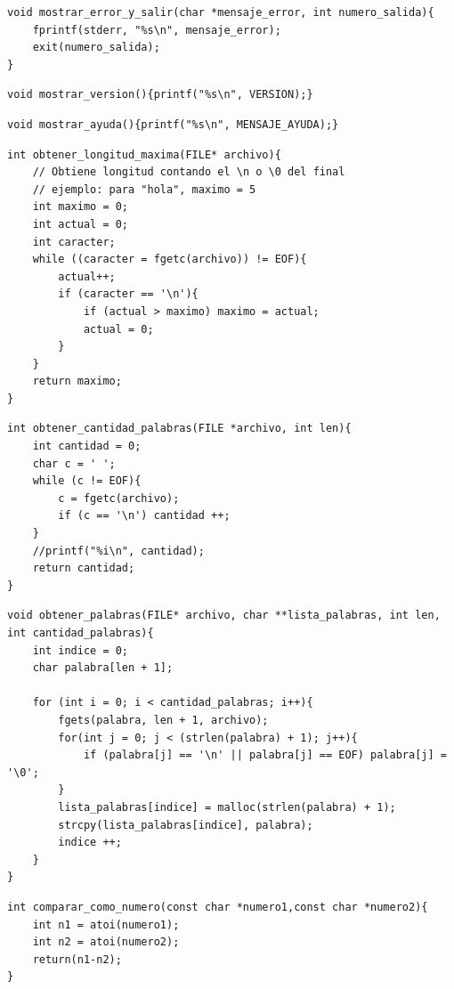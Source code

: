 \documentclass[a4paper, 12pt]{article}
\begin{document}
	\begin{lstlisting}
void mostrar_error_y_salir(char *mensaje_error, int numero_salida){
	fprintf(stderr, "%s\n", mensaje_error);
    exit(numero_salida);
}
	\end{lstlisting}
	
	\begin{lstlisting}
void mostrar_version(){printf("%s\n", VERSION);}
	\end{lstlisting}
	
	\begin{lstlisting}
void mostrar_ayuda(){printf("%s\n", MENSAJE_AYUDA);}
	\end{lstlisting}
	
	\begin{lstlisting}
int obtener_longitud_maxima(FILE* archivo){
    // Obtiene longitud contando el \n o \0 del final
    // ejemplo: para "hola", maximo = 5
    int maximo = 0;
    int actual = 0;
    int caracter;
    while ((caracter = fgetc(archivo)) != EOF){
        actual++;
        if (caracter == '\n'){
            if (actual > maximo) maximo = actual;
            actual = 0;
        }
    }
    return maximo;
}
	\end{lstlisting}
	
	\begin{lstlisting}
int obtener_cantidad_palabras(FILE *archivo, int len){
    int cantidad = 0;
    char c = ' ';
    while (c != EOF){
        c = fgetc(archivo);
        if (c == '\n') cantidad ++;
    }
    //printf("%i\n", cantidad);
    return cantidad;
}
	\end{lstlisting}
	
	\begin{lstlisting}
void obtener_palabras(FILE* archivo, char **lista_palabras, int len, int cantidad_palabras){
    int indice = 0;
    char palabra[len + 1];

    for (int i = 0; i < cantidad_palabras; i++){
        fgets(palabra, len + 1, archivo);
        for(int j = 0; j < (strlen(palabra) + 1); j++){
            if (palabra[j] == '\n' || palabra[j] == EOF) palabra[j] = '\0';
        }
        lista_palabras[indice] = malloc(strlen(palabra) + 1);
        strcpy(lista_palabras[indice], palabra);
        indice ++;
    }
}
	\end{lstlisting}
	
	\begin{lstlisting}
int comparar_como_numero(const char *numero1,const char *numero2){
    int n1 = atoi(numero1);
    int n2 = atoi(numero2);
    return(n1-n2);
}
	\end{lstlisting}
	
\end{document}
